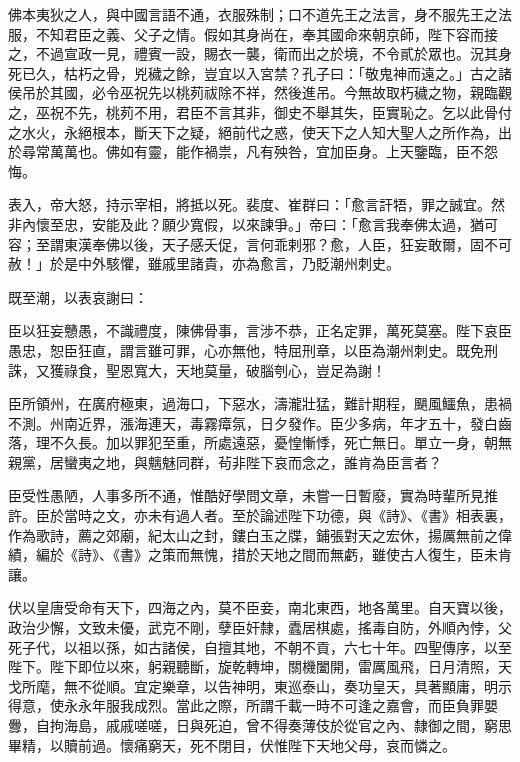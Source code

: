 \begin{pinyinscope}
 佛本夷狄之人，與中國言語不通，衣服殊制；口不道先王之法言，身不服先王之法服，不知君臣之義、父子之情。假如其身尚在，奉其國命來朝京師，陛下容而接之，不過宣政一見，禮賓一設，賜衣一襲，衛而出之於境，不令貳於眾也。況其身死已久，枯朽之骨，兇穢之餘，豈宜以入宮禁？孔子曰：「敬鬼神而遠之。」古之諸侯吊於其國，必令巫祝先以桃茢祓除不祥，然後進吊。今無故取朽穢之物，親臨觀之，巫祝不先，桃茢不用，君臣不言其非，御史不舉其失，臣實恥之。乞以此骨付之水火，永絕根本，斷天下之疑，絕前代之惑，使天下之人知大聖人之所作為，出於尋常萬萬也。佛如有靈，能作禍祟，凡有殃咎，宜加臣身。上天鑒臨，臣不怨悔。



 表入，帝大怒，持示宰相，將抵以死。裴度、崔群曰：「愈言訐牾，罪之誠宜。然非內懷至忠，安能及此？願少寬假，以來諫爭。」帝曰：「愈言我奉佛太過，猶可容；至謂東漢奉佛以後，天子感夭促，言何乖剌邪？愈，人臣，狂妄敢爾，固不可赦！」於是中外駭懼，雖戚里諸貴，亦為愈言，乃貶潮州刺史。



 既至潮，以表哀謝曰：



 臣以狂妄戇愚，不識禮度，陳佛骨事，言涉不恭，正名定罪，萬死莫塞。陛下哀臣愚忠，恕臣狂直，謂言雖可罪，心亦無他，特屈刑章，以臣為潮州刺史。既免刑誅，又獲祿食，聖恩寬大，天地莫量，破腦刳心，豈足為謝！



 臣所領州，在廣府極東，過海口，下惡水，濤瀧壯猛，難計期程，颶風鱷魚，患禍不測。州南近界，漲海連天，毒霧瘴氛，日夕發作。臣少多病，年才五十，發白齒落，理不久長。加以罪犯至重，所處遠惡，憂惶慚悸，死亡無日。單立一身，朝無親黨，居蠻夷之地，與魑魅同群，茍非陛下哀而念之，誰肯為臣言者？



 臣受性愚陋，人事多所不通，惟酷好學問文章，未嘗一日暫廢，實為時輩所見推許。臣於當時之文，亦未有過人者。至於論述陛下功德，與《詩》、《書》相表裏，作為歌詩，薦之郊廟，紀太山之封，鏤白玉之牒，鋪張對天之宏休，揚厲無前之偉績，編於《詩》、《書》之策而無愧，措於天地之間而無虧，雖使古人復生，臣未肯讓。



 伏以皇唐受命有天下，四海之內，莫不臣妾，南北東西，地各萬里。自天寶以後，政治少懈，文致未優，武克不剛，孽臣奸隸，蠹居棋處，搖毒自防，外順內悖，父死子代，以祖以孫，如古諸侯，自擅其地，不朝不貢，六七十年。四聖傳序，以至陛下。陛下即位以來，躬親聽斷，旋乾轉坤，關機闔開，雷厲風飛，日月清照，天戈所麾，無不從順。宜定樂章，以告神明，東巡泰山，奏功皇天，具著顯庸，明示得意，使永永年服我成烈。當此之際，所謂千載一時不可逢之嘉會，而臣負罪嬰釁，自拘海島，戚戚嗟嗟，日與死迫，曾不得奏薄伎於從官之內、隸御之間，窮思畢精，以贖前過。懷痛窮天，死不閉目，伏惟陛下天地父母，哀而憐之。




\end{pinyinscope}
